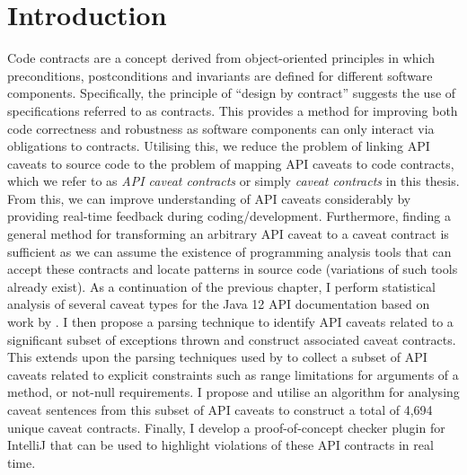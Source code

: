\section{Introduction}
\label{sec:contract-intro}
Code contracts are a concept derived from object-oriented principles in which preconditions, postconditions and invariants are defined for different software components. Specifically, the principle of ``design by contract'' suggests the use of specifications referred to as contracts. This provides a method for improving both code correctness and robustness as software components can only interact via obligations to contracts. Utilising this, we reduce the problem of linking API caveats to source code to the problem of mapping API caveats to code contracts, which we refer to as \textit{API caveat contracts} or simply \textit{caveat contracts} in this thesis. From this, we can improve understanding of API caveats considerably by providing real-time feedback during coding/development. Furthermore, finding a general method for transforming an arbitrary API caveat to a caveat contract is sufficient as we can assume the existence of programming analysis tools that can accept these contracts and locate patterns in source code (variations of such tools already exist). As a continuation of the previous chapter, I perform statistical analysis of several caveat types for the Java 12 API documentation based on work by \cite{zhou-directive}. I then propose a parsing technique to identify API caveats related to a significant subset of exceptions thrown and construct associated caveat contracts. This extends upon the parsing techniques used by \citeauthor{zhou-directive} to collect a subset of API caveats related to explicit constraints such as range limitations for arguments of a method, or not-null requirements. I propose and utilise an algorithm for analysing caveat sentences from this subset of API caveats to construct a total of 4,694 unique caveat contracts. Finally, I develop a proof-of-concept checker plugin for IntelliJ that can be used to highlight violations of these API contracts in real time. \\

